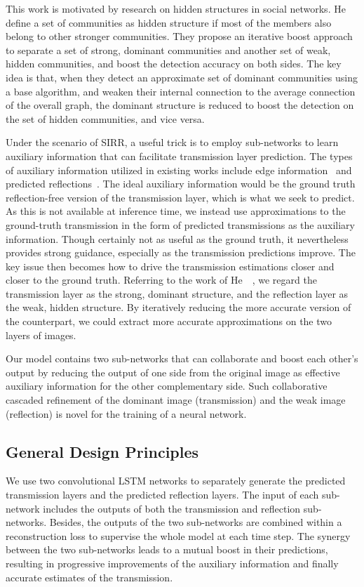 \documentclass[10pt,twocolumn,letterpaper]{article}
\begin{document}
This work is motivated by research on hidden structures in social networks.
He~\etal~\cite{he2018hidden,He15corr} define a set of communities as hidden structure if most of the members also belong to other stronger communities. They propose an iterative boost approach to separate a set of strong, dominant communities and another set of weak, hidden communities, and boost the detection accuracy on both sides. The key idea is that, when they detect an approximate set of dominant communities using a base algorithm, and weaken their internal connection to the average connection of the overall graph, the dominant structure is reduced to boost the detection on the set of hidden communities, and vice versa.

Under the scenario of SIRR, a useful trick is to employ sub-networks to learn auxiliary information that can facilitate transmission layer prediction. The types of auxiliary information utilized in existing works include edge information~\cite{fan2017generic, wan2018crrn} and predicted reflections~\cite{yang2018seeing}.
The ideal auxiliary information would be the ground truth reflection-free version of the transmission layer, which is what we seek to predict. As this is not available at inference time, we instead use approximations to the ground-truth transmission in the form of predicted transmissions as the auxiliary information. Though certainly not as useful as the ground truth, it nevertheless provides strong guidance, especially as the transmission predictions improve. The key issue then becomes how to drive the transmission estimations closer and closer to the ground truth.  Referring to the work of He~\etal~\cite{he2018hidden,He15corr}, we regard the transmission layer as the strong, dominant structure, and the reflection layer as the weak, hidden structure. By iteratively reducing the more accurate version of the counterpart, we could extract more accurate approximations on the two layers of images.

Our model contains two sub-networks that can collaborate and boost each other's output by reducing the output of one side from the original image as effective auxiliary information for the other complementary side. Such collaborative cascaded refinement of the dominant image (transmission) and the weak image (reflection) is novel for the training of a neural network.  


\subsection{General Design Principles} \label{sec:design}
We use two convolutional LSTM networks to separately generate the predicted transmission layers and the predicted reflection layers. The input of each sub-network includes the outputs of both the transmission and reflection sub-networks. Besides, the outputs of the two sub-networks are combined within a reconstruction loss to supervise the whole model at each time step. The synergy between the two sub-networks leads to a mutual boost in their predictions, resulting in progressive improvements of the auxiliary information and finally accurate estimates of the transmission.
\end{document}
